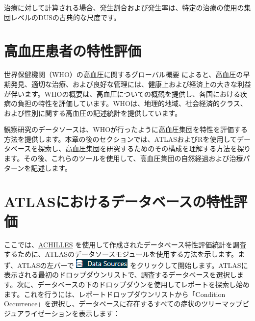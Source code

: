 \documentclass[
  11pt]{book}
\theoremstyle{definition}
\theoremstyle{definition}
\theoremstyle{definition}
\theoremstyle{definition}
\theoremstyle{remark}
\begin{document}
治療に対して計算される場合、発生割合および発生率は、特定の治療の使用の集団レベルのDUSの古典的な尺度です。

\section{高血圧患者の特性評価}\label{ux9ad8ux8840ux5727ux60a3ux8005ux306eux7279ux6027ux8a55ux4fa1}

世界保健機関（WHO）の高血圧に関するグローバル概要 \citep{WHOHypertension} によると、高血圧の早期発見、適切な治療、および良好な管理には、健康上および経済上の大きな利益が伴います。WHOの概要は、高血圧についての概観を提供し、各国における疾病の負担の特性を評価しています。WHOは、地理的地域、社会経済的クラス、および性別に関する高血圧の記述統計を提供しています。

観察研究のデータソースは、WHOが行ったように高血圧集団を特性を評価する方法を提供します。本章の後のセクションでは、ATLASおよびRを使用してデータベースを探索し、高血圧集団を研究するためのその構成を理解する方法を探ります。その後、これらのツールを使用して、高血圧集団の自然経過および治療パターンを記述します。

\section{ATLASにおけるデータベースの特性評価}\label{atlasux306bux304aux3051ux308bux30c7ux30fcux30bfux30d9ux30fcux30b9ux306eux7279ux6027ux8a55ux4fa1}

ここでは、\href{https://github.com/OHDSI/Achilles}{ACHILLES} を使用して作成されたデータベース特性評価統計を調査するために、ATLASのデータソースモジュールを使用する方法を示します。まず、ATLASの左バーで \includegraphics{images/Characterization/atlasDataSourcesMenuItem.png} をクリックして開始します。ATLASに表示される最初のドロップダウンリストで、調査するデータベースを選択します。次に、データベースの下のドロップダウンを使用してレポートを探索し始めます。これを行うには、レポートドロップダウンリストから「Condition Occurrence」を選択し、データベースに存在するすべての症状のツリーマップビジュアライゼーションを表示します：
\end{document}

